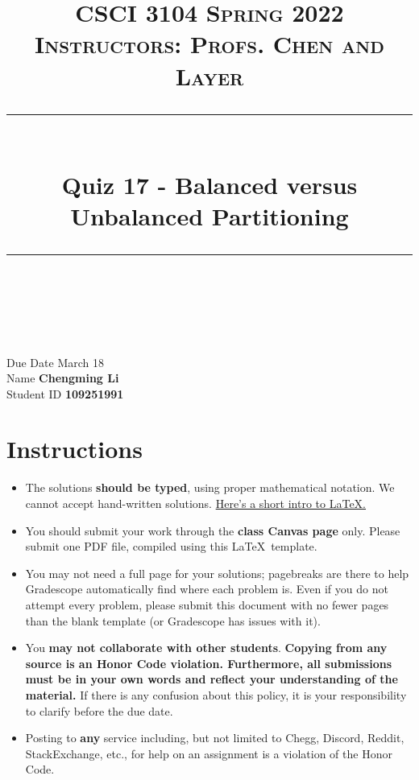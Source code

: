 \documentclass[11pt]{article}
\title{
\normalfont \normalsize 
\textsc{CSCI 3104 Spring 2022 \\ 
Instructors: Profs. Chen and Layer} \\
[10pt] 
\rule{\linewidth}{0.5pt} \\[6pt] 
\huge Quiz 17 - Balanced versus Unbalanced Partitioning \\
\rule{\linewidth}{2pt}  \\[10pt]
}
\date{}
\theoremstyle{definition}
\theoremstyle{definition}
\theoremstyle{definition}
\begin{document}

\maketitle


\noindent
Due Date \dotfill March 18 \\
Name \dotfill \textbf{Chengming Li} \\
Student ID \dotfill \textbf{109251991} \\


\tableofcontents

\section{Instructions}
 \begin{itemize}
	\item The solutions \textbf{should be typed}, using proper mathematical notation. We cannot accept hand-written solutions. \href{http://ece.uprm.edu/~caceros/latex/introduction.pdf}{Here's a short intro to \LaTeX.}
	\item You should submit your work through the \textbf{class Canvas page} only. Please submit one PDF file, compiled using this \LaTeX \ template.
	\item You may not need a full page for your solutions; pagebreaks are there to help Gradescope automatically find where each problem is. Even if you do not attempt every problem, please submit this document with no fewer pages than the blank template (or Gradescope has issues with it).

	\item You \textbf{may not collaborate with other students}. \textbf{Copying from any source is an Honor Code violation. Furthermore, all submissions must be in your own words and reflect your understanding of the material.} If there is any confusion about this policy, it is your responsibility to clarify before the due date. 

	\item Posting to \textbf{any} service including, but not limited to Chegg, Discord, Reddit, StackExchange, etc., for help on an assignment is a violation of the Honor Code.

\end{itemize}
\end{document}
